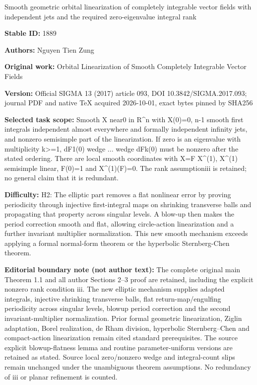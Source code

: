 \documentclass[11pt]{article}
\numberwithin{equation}{section}
\begin{document}
\begin{center}\Large Smooth geometric orbital linearization of completely integrable vector fields with independent jets and the required zero-eigenvalue integral rank\end{center}
\noindent\textbf{Stable ID:} 1889\par
\noindent\textbf{Authors:} Nguyen Tien Zung\par
\noindent\textbf{Original work:} Orbital Linearization of Smooth Completely Integrable Vector Fields\par
\noindent\textbf{Version:} Official SIGMA 13 (2017) article 093, DOI 10.3842/SIGMA.2017.093; journal PDF and native TeX acquired 2026-10-01, exact bytes pinned by SHA256\par
\noindent\textbf{Selected task scope:} Smooth X near0 in R\textasciicircum{}n with X(0)=\allowbreak{}0, n-1 smooth first integrals independent almost everywhere and formally independent infinity jets, and nonzero semisimple part of the linearization. If zero is an eigenvalue with multiplicity k>=\allowbreak{}1, dF1(0) wedge ... wedge dFk(0) must be nonzero after the stated ordering. There are local smooth coordinates with X=\allowbreak{}F X\textasciicircum{}(1), X\textasciicircum{}(1) semisimple linear, F(0)=\allowbreak{}1 and X\textasciicircum{}(1)(F)=\allowbreak{}0. The rank assumptioniii is retained; no general claim that it is redundant.\par
\noindent\textbf{Difficulty:} H2: The elliptic part removes a flat nonlinear error by proving periodicity through injective first-integral maps on shrinking transverse balls and propagating that property across singular levels. A blow-up then makes the period correction smooth and flat, allowing circle-action linearization and a further invariant multiplier normalization. This new smooth mechanism exceeds applying a formal normal-form theorem or the hyperbolic Sternberg-Chen theorem.\par
\noindent\textbf{Editorial boundary note (not author text):} The complete original main Theorem 1.1 and all author Sections 2–3 proof are retained, including the explicit nonzero rank condition iii. The new elliptic mechanism supplies adapted integrals, injective shrinking transverse balls, flat return-map/engulfing periodicity across singular levels, blowup period correction and the second invariant-multiplier normalization. Prior formal geometric linearization, Ziglin adaptation, Borel realization, de Rham division, hyperbolic Sternberg–Chen and compact-action linearization remain cited standard prerequisites. The source explicit blowup-flatness lemma and routine parameter-uniform versions are retained as stated. Source local zero/nonzero wedge and integral-count slips remain unchanged under the unambiguous theorem assumptions. No redundancy of iii or planar refinement is counted.\par
\end{document}
